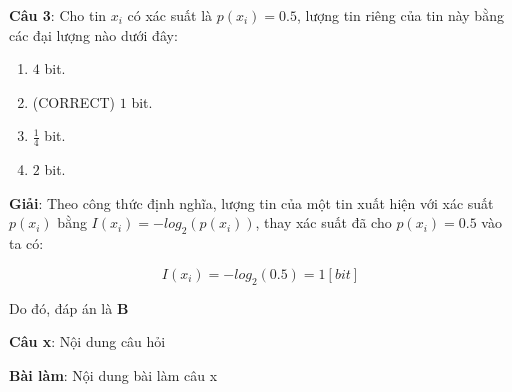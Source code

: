 \documentclass[12pt]{article}
\begin{document}
\newpage
\textbf{Câu 3}: Cho tin $x_i$ có xác suất là $p(x_i)=0.5$, lượng tin riêng của tin này bằng các đại lượng nào dưới đây:

 \begin{enumerate}[label=\Alph*.]
    \item $4$ bit.
    \item (CORRECT) $1$ bit.
    \item $\frac{1}{4}$ bit.
    \item $2$ bit.
 \end{enumerate}


\textbf{Giải}: Theo công thức định nghĩa, lượng tin của một tin xuất hiện với xác suất $p(x_i)$ bằng $I(x_i)=-log_2(p(x_i))$, thay xác suất đã cho $p(x_i)=0.5$ vào ta có:

$$ I(x_i) = - log_2(0.5) = 1 [bit]$$

Do đó, đáp án là \textbf{B}

\newpage
\textbf{Câu x}: Nội dung câu hỏi

\textbf{Bài làm}: Nội dung bài làm câu x
\end{document}
